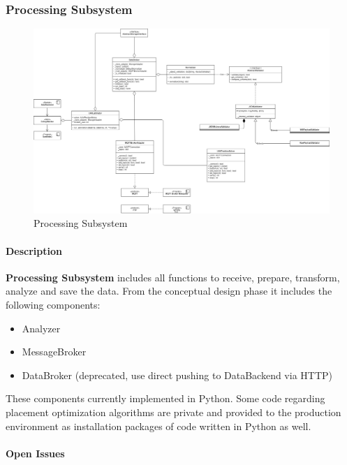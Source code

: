\hypertarget{processing-subsystem}{%
\subsubsection{Processing Subsystem}\label{processing-subsystem}}

\begin{figure}
\centering
\includegraphics{schemes/classes/ClassDiagram-processing_subsystem.png}
\caption{Processing Subsystem}
\end{figure}

\hypertarget{description}{%
\paragraph{Description}\label{description}}

\textbf{Processing Subsystem} includes all functions to receive,
prepare, transform, analyze and save the data. From the conceptual
design phase it includes the following components:

\begin{itemize}
\tightlist
\item
  Analyzer
\item
  MessageBroker
\item
  DataBroker (deprecated, use direct pushing to DataBackend via HTTP)
\end{itemize}

These components currently implemented in Python. Some code regarding
placement optimization algorithms are private and provided to the
production environment as installation packages of code written in
Python as well.

\hypertarget{open-issues}{%
\paragraph{Open Issues}\label{open-issues}}

